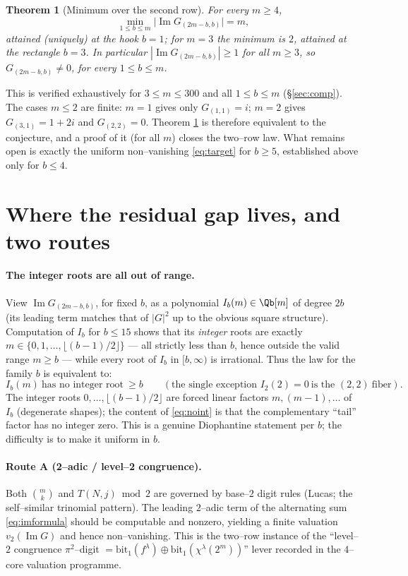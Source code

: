 \documentclass[11pt]{article}
\newtheorem{theorem}{Theorem}
\theoremstyle{definition}
\renewcommand{\Im}{\operatorname{Im}}
\newcommand{\im}{\Im}
\begin{document}
\begin{theorem}[Minimum over the second row]\label{thm:minimum}
For every $m\ge4$,
\[
   \min_{1\le b\le m}\bigl|\im G_{(2m-b,b)}\bigr|=m,
\]
attained \textup(uniquely\textup) at the hook $b=1$; for $m=3$ the minimum is
$2$, attained at the rectangle $b=3$.  In particular $|\im G_{(2m-b,b)}|\ge1$ for
all $m\ge3$, so $G_{(2m-b,b)}\neq0$, for every $1\le b\le m$.
\end{theorem}

\noindent
This is verified exhaustively for $3\le m\le300$ and all $1\le b\le m$
(\S\ref{sec:comp}).  The cases $m\le2$ are finite: $m=1$ gives only
$G_{(1,1)}=i$; $m=2$ gives $G_{(3,1)}=1+2i$ and $G_{(2,2)}=0$.  Theorem
\ref{thm:minimum} is therefore equivalent to the conjecture, and a proof of it
(for all $m$) closes the two--row law.  What remains open is exactly the uniform
non--vanishing \eqref{eq:target} for $b\ge5$, established above only for
$b\le4$.

\section{Where the residual gap lives, and two routes}

\paragraph{The integer roots are all out of range.}
View $\im G_{(2m-b,b)}$, for fixed $b$, as a polynomial $I_b(m)\in\Qb[m]$ of degree
$2b$ \textup(its leading term matches that of $|G|^2$ up to the obvious square
structure\textup).  Computation of $I_b$ for $b\le15$ shows that its
\emph{integer} roots are exactly $m\in\{0,1,\dots,\lfloor(b-1)/2\rfloor\}$ --- all
strictly less than $b$, hence outside the valid range $m\ge b$ --- while every
root of $I_b$ in $[b,\infty)$ is irrational.  Thus the law for the family $b$ is
equivalent to:
\begin{equation}\label{eq:noint}
   I_b(m)\ \text{has no integer root}\ \ge b
   \qquad(\text{the single exception }I_2(2)=0\ \text{is the }(2,2)\ \text{fiber}).
\end{equation}
The integer roots $0,\dots,\lfloor(b-1)/2\rfloor$ are forced linear factors
$m,(m-1),\dots$ of $I_b$ (degenerate shapes); the content of \eqref{eq:noint} is
that the complementary ``tail'' factor has no integer zero.  This is a genuine
Diophantine statement per $b$; the difficulty is to make it uniform in $b$.

\paragraph{Route A (2--adic / level--2 congruence).}
Both $\binom{m}{k}$ and $T(N,j)\bmod2$ are governed by base--$2$ digit rules
(Lucas; the self--similar trinomial pattern).  The leading $2$--adic term of the
alternating sum \eqref{eq:imformula} should be computable and nonzero, yielding a
finite valuation $v_2(\im G)$ and hence non--vanishing.  This is the two--row
instance of the ``level--$2$ congruence $\pi^2$--digit $=\mathrm{bit}_1(f^\lambda)
\oplus\mathrm{bit}_1(\chi^\lambda(2^m))$'' lever recorded in the $4$--core
valuation programme.
\end{document}

